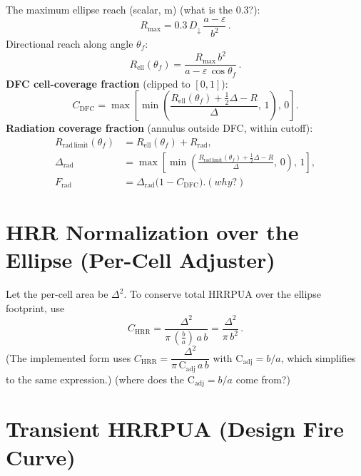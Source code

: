 \documentclass[a4paper,12pt]{article}
\begin{document}
The maximum ellipse reach (scalar, m) (what is the 0.3?):
\begin{equation}
R_{\max}=0.3\,D_\downarrow\,\frac{a-\varepsilon}{b^2}\, .
\end{equation}
Directional reach along angle $\theta_f$:
\begin{equation}
R_{\mathrm{ell}}(\theta_f)=\frac{R_{\max}\,b^2}{a-\varepsilon\,\cos\theta_f}\, .
\end{equation}
\textbf{DFC cell-coverage fraction} (clipped to $[0,1]$):
\begin{equation}
C_{\mathrm{DFC}}=\max\left[\min\left(\frac{R_{\mathrm{ell}}(\theta_f)+\tfrac{1}{2}\Delta - R}{\Delta},\,1\right),\,0\right].
\end{equation}
\textbf{Radiation coverage fraction} (annulus outside DFC, within cutoff):
\begin{align}
R_{\mathrm{rad\,limit}}(\theta_f)&=R_{\mathrm{ell}}(\theta_f)+R_{\mathrm{rad}},\\[4pt]
\Delta_{\mathrm{rad}}&=\max\left[\min\left(\frac{R_{\mathrm{rad\,limit}}(\theta_f)+\tfrac{1}{2}\Delta - R}{\Delta},\,0\right),\,1\right],\\[4pt]
F_{\mathrm{rad}}&=\Delta_{\mathrm{rad}}\bigl(1-C_{\mathrm{DFC}}\bigr). (why?)
\end{align}

\section{HRR Normalization over the Ellipse (Per-Cell Adjuster)}

Let the per-cell area be $\Delta^2$. To conserve total HRRPUA over the ellipse footprint, use
\begin{equation}
C_\mathrm{HRR}=\frac{\Delta^2}{\pi\,\left(\frac{b}{a}\right)\,a\,b}=\frac{\Delta^2}{\pi\,b^2}\, .
\end{equation}
(The implemented form uses $C_\mathrm{HRR}=\dfrac{\Delta^2}{\pi\,\mathrm{C_{adj}}\,a\,b}$ with $\mathrm{C_{adj}}=b/a$, which simplifies to the same expression.) (where does the $\mathrm{C_{adj}}=b/a$ come from?)

\section{Transient HRRPUA (Design Fire Curve)}\label{hrrpua}
\end{document}
